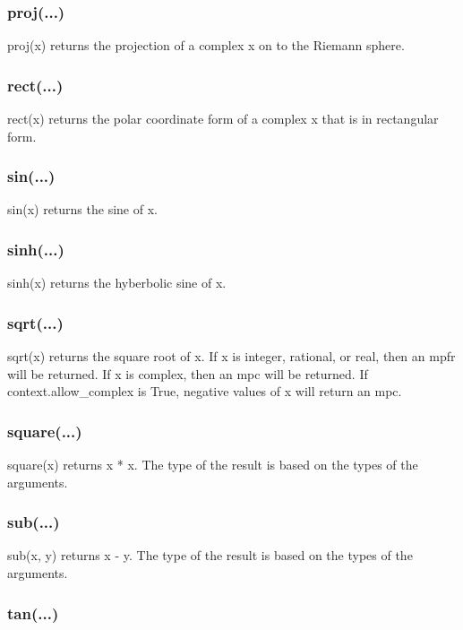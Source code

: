 \subsubsection{proj(...)}

proj(x) returns the projection of a complex x on to the Riemann sphere.

\subsubsection{rect(...)}

rect(x) returns the polar coordinate form of a complex x that is in rectangular form.

\subsubsection{sin(...)}

sin(x) returns the sine of x.

\subsubsection{sinh(...)}

sinh(x) returns the hyberbolic sine of x.

\subsubsection{sqrt(...)}

sqrt(x) returns the square root of x. If x is integer, rational, or real, then an mpfr will be
returned. If x is complex, then an mpc will be returned. If context.allow\_complex is True,
negative values of x will return an mpc.

\subsubsection{square(...)}

square(x) returns x * x. The type of the result is based on the types of the arguments.

\subsubsection{sub(...)}

sub(x, y) returns x - y. The type of the result is based on the types of the arguments.

\subsubsection{tan(...)}

